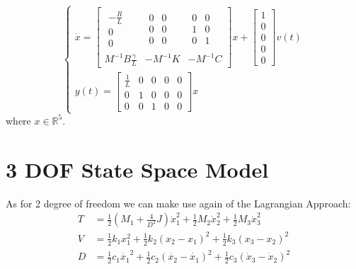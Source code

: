 \begin{equation}
\begin{cases}
\dot{x}=
\left[ \begin{array} { c|c|c  } 
                \begin{array}{c} 
               -\frac{R}{L} \\ 
                0 \\
                0 
                \end{array} &
                \begin{array}{cc} 
               0 & 0 \\ 
                0 & 0 \\
                0  & 0 
                \end{array}&
                \begin{array}{cc} 
               0 & 0 \\ 
                1 & 0 \\
                0  & 1 
                \end{array} \\
                \hline 
                M^{-1}B\frac{\gamma} {L}& -M^{-1}K & -M^{-1}C
\end{array} \right] 
x+\begin{bmatrix}1 \\ 0 \\ 0 \\ 0 \\ 0\end{bmatrix}v(t)\\
y(t) = \begin{bmatrix} \frac{1}{L} & 0 & 0 & 0 & 0 \\
0 & 1 & 0 & 0 & 0 \\
0 & 0 & 1 & 0 & 0 \end{bmatrix}x
\end{cases}
\end{equation}
where $x \in \mathbb{R}^5$.

\section{3 DOF State Space Model}
As for 2 degree of freedom we can make use again of the Lagrangian Approach:
\begin{align*}
T &= \frac{1}{2} (M_1 + \frac{4}{D^2}J)\dot{x}_1^2+\frac{1}{2}M_2\dot{x}_2^2 + \frac{1}{2}M_3 \dot{x}_3^2 \\
V &= \frac{1}{2}k_1x_1^2 + \frac{1}{2}k_2(x_2-x_1)^2 +\frac{1}{2}k_3 (x_3-x_2)^2\\
D &= \frac{1}{2}c_1\dot{x_1}^2 + \frac{1}{2}c_2(\dot{x_2}-\dot{x_1})^2 +\frac{1}{2}c_3(\dot{x}_3-\dot{x}_2)^2
\end{align*}

